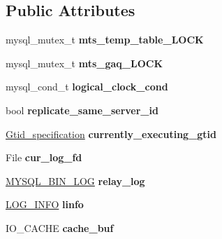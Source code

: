 \subsection*{Public Attributes}
\begin{DoxyCompactItemize}
\item 
\mbox{\label{classRelay__log__info_ad81ee3feef070c6b950a204bc3abd6c3}} 
mysql\+\_\+mutex\+\_\+t {\bfseries mts\+\_\+temp\+\_\+table\+\_\+\+L\+O\+CK}
\item 
\mbox{\label{classRelay__log__info_affa9fc41666186c0dd3e2d1eaf51b9e4}} 
mysql\+\_\+mutex\+\_\+t {\bfseries mts\+\_\+gaq\+\_\+\+L\+O\+CK}
\item 
\mbox{\label{classRelay__log__info_a24b2857beecd824f03bfed7352f8ac31}} 
mysql\+\_\+cond\+\_\+t {\bfseries logical\+\_\+clock\+\_\+cond}
\item 
\mbox{\label{classRelay__log__info_a51d97a5d58159e94c6f49732939a3045}} 
bool {\bfseries replicate\+\_\+same\+\_\+server\+\_\+id}
\item 
\mbox{\label{classRelay__log__info_a13789955a16f858f2d78842a77d91b97}} 
\mbox{\hyperlink{structGtid__specification}{Gtid\+\_\+specification}} {\bfseries currently\+\_\+executing\+\_\+gtid}
\item 
\mbox{\label{classRelay__log__info_a81ed15bfff825903fc74ac14a80af072}} 
File {\bfseries cur\+\_\+log\+\_\+fd}
\item 
\mbox{\label{classRelay__log__info_a9bbad242863fab978884b5c60b4a1b28}} 
\mbox{\hyperlink{classMYSQL__BIN__LOG}{M\+Y\+S\+Q\+L\+\_\+\+B\+I\+N\+\_\+\+L\+OG}} {\bfseries relay\+\_\+log}
\item 
\mbox{\label{classRelay__log__info_a08fbb593a576198c6afbe512deb9c476}} 
\mbox{\hyperlink{structst__log__info}{L\+O\+G\+\_\+\+I\+N\+FO}} {\bfseries linfo}
\item 
\mbox{\label{classRelay__log__info_a608cc64769e108143a29f16670acd9e6}} 
I\+O\+\_\+\+C\+A\+C\+HE {\bfseries cache\+\_\+buf}

\end{DoxyCompactItemize}
